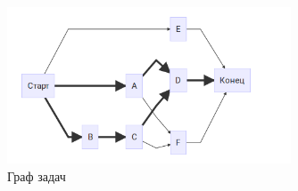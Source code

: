 \begin{figure}[h]
\begin{center}
\includegraphics[width=0.75\textwidth]{GrafZadach}
\caption{Граф задач}
\end{center}
\label{fig:figure1}
\end{figure}
